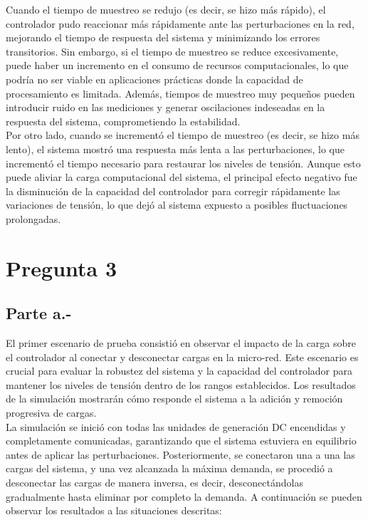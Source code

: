 
Cuando el tiempo de muestreo se redujo (es decir, se hizo más rápido), el controlador pudo reaccionar más rápidamente ante las perturbaciones en la red, mejorando el tiempo de respuesta del sistema y minimizando los errores transitorios. Sin embargo, si el tiempo de muestreo se reduce excesivamente, puede haber un incremento en el consumo de recursos computacionales, lo que podría no ser viable en aplicaciones prácticas donde la capacidad de procesamiento es limitada. Además, tiempos de muestreo muy pequeños pueden introducir ruido en las mediciones y generar oscilaciones indeseadas en la respuesta del sistema, comprometiendo la estabilidad.\\

Por otro lado, cuando se incrementó el tiempo de muestreo (es decir, se hizo más lento), el sistema mostró una respuesta más lenta a las perturbaciones, lo que incrementó el tiempo necesario para restaurar los niveles de tensión. Aunque esto puede aliviar la carga computacional del sistema, el principal efecto negativo fue la disminución de la capacidad del controlador para corregir rápidamente las variaciones de tensión, lo que dejó al sistema expuesto a posibles fluctuaciones prolongadas.

\section{Pregunta 3}

\subsection{Parte a.-}

El primer escenario de prueba consistió en observar el impacto de la carga sobre el controlador al conectar y desconectar cargas en la micro-red. Este escenario es crucial para evaluar la robustez del sistema y la capacidad del controlador para mantener los niveles de tensión dentro de los rangos establecidos. Los resultados de la simulación mostrarán cómo responde el sistema a la adición y remoción progresiva de cargas.\\

La simulación se inició con todas las unidades de generación DC encendidas y completamente comunicadas, garantizando que el sistema estuviera en equilibrio antes de aplicar las perturbaciones. Posteriormente, se conectaron una a una las cargas del sistema, y una vez alcanzada la máxima demanda, se procedió a desconectar las cargas de manera inversa, es decir, desconectándolas gradualmente hasta eliminar por completo la demanda. A continuación se pueden observar los resultados a las situaciones descritas:

